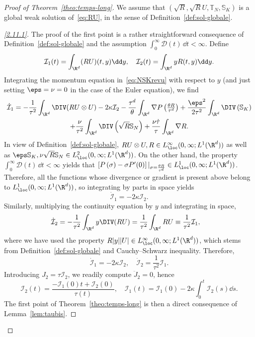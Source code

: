 \begin{proof}[Proof of Theorem~\ref{theo:temps-long}]
We assume that $(\sqrt{R},\sqrt{R}U,\mathbb T_N,\mathbb S_K)$ is a global weak solution of~\eqref{eq:RU}, in the sense of Definition~\ref{def:sol-globale}.

\begin{proof}[\eqref{2.11.1}]
The proof of the first point is a rather straightforward consequence of Definition~\ref{def:sol-globale} and the assumption $\int_0^\infty \mathcal D(t) \, \dd t < \infty$. Define
\begin{equation*}
\mathcal I_1(t)=\int_{\R^d} (RU)(t,y)\dd y,\quad \mathcal I_2(t)= \int_{\R^d}y R(t,y)\dd y.
\end{equation*}
Integrating the momentum equation in~\eqref{eq:NSKrevu} with respect to $y$ (and just setting $\eps=\nu=0$ in the case of the Euler equation), we find
\begin{multline*}
\dot {\mathcal I}_1 = -\frac{1}{\tau^2}\int_{\R^d}\DIV (R U \otimes U) -2\kappa\mathcal I_2 -\frac{\tau^d}{\theta}\int_{\R^d}\nabla P\left(\tfrac{\theta R}{\tau^d}\right) +
\frac{\eps^2}{2\tau^2}\int_{\R^d} \DIV \left(\mathbb S_K \right)\\
+\frac{\nu}{\tau^2} \int_{\R^d} \DIV \left(\sqrt R \mathbb S_N\right) + \frac{\nu \dot
\tau}{\tau} \int_{\R^d}\nabla R.
\end{multline*}
In view of Definition~\ref{def:sol-globale}, $RU\otimes U,R\in L^\infty_{\loc}(0,\infty;L^1(\R^d))$ as well as $\eps \mathbb S_K, \nu \sqrt R \mathbb S_N\in L^2_{\loc}(0,\infty;L^1(\R^d))$. On the other hand, the property $\int_0^\infty \mathcal D(t) \, \dd t < \infty$ yields that $ \left[P\left(\sigma\right) -\sigma P'(0) \right] |_{\sigma= \frac{ \theta R}{\tau^d}}\in L^1_{\loc}(0,\infty;L^1(\R^d))$. Therefore, all the functions whose divergence or gradient is present above belong to $L^1_{\loc}(0,\infty;L^1(\R^d))$, so integrating by parts in space yields
\[
\dot {\mathcal I}_1 = -2\kappa \mathcal I_2.
\]
Similarly, multiplying the continuity equation by $y$ and integrating in space,
\begin{align*}
\dot{\mathcal I}_2 & = -\frac{1}{\tau^2}\int_{\R^d}y \DIV (RU) =\frac{1}{\tau^2} \int_{\R^d} RU\equiv
\frac{1}{\tau^2}\mathcal I_1,
\end{align*}
where we have used the property $ R |y||U|\in L^\infty_{\loc}(0,\infty;L^1(\R^d))$, which stems from Definition~\ref{def:sol-globale} and Cauchy--Schwarz inequality. Therefore,
\[
\dot {\mathcal I}_1 = -2\kappa \mathcal I_2,\quad \dot {\mathcal I}_2 = \frac{1}{\tau^2}\mathcal I_1.
\]
Introducing $J_2=\tau \mathcal I_2$, we readily compute $\ddot J_2=0$, hence
\begin{equation*}
\mathcal I_2(t) = \frac{-\mathcal I_1(0)t+\mathcal I_2(0)}{\tau(t)},\quad \mathcal I_1(t) =
\mathcal I_1(0)-2\kappa \int_0^t \mathcal I_2(s)\dd s.
\end{equation*}
The first point of Theorem~\ref{theo:temps-long} is then a direct consequence of Lemma~\ref{lem:taubis}.
\let\qed\relax
\end{proof}


\end{proof}
